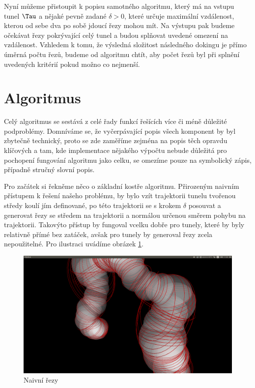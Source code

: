 Nyní můžeme přistoupit k popisu samotného algoritmu, který má na vstupu tunel $ \Tau $
a nějaké pevně zadané $ \delta > 0$, které určuje maximální vzdálenost, kterou
od sebe dva po sobě jdoucí řezy mohou mít. Na výstupu pak budeme očekávat řezy pokrývající
celý tunel a budou splňovat uvedené omezení na vzdálenost. Vzhledem k tomu, že výsledná
složitost následného dokingu je přímo úměrná počtu řezů, budeme od algoritmu chtít,
aby počet řezů byl při splnění uvedených kritérií pokud možno co nejmenší.


\section{Algoritmus}

Celý algoritmus se sestává z celé řady funkcí řešících více či méně důležité podproblémy.
Domníváme se, že vyčerpávající popis všech komponent by byl zbytečně technický,
proto se zde zaměříme zejména na popis těch opravdu klíčových
a tam, kde implementace nějakého výpočtu nebude důležitá pro pochopení fungování
algoritmu jako celku, se omezíme pouze na symbolický zápis, případně stručný slovní
popis.

Pro začátek si řekněme něco o základní kostře algoritmu. Přirozeným naivním přístupem
k řešení našeho problému, by bylo vzít trajektorii tunelu tvořenou středy koulí
jím definované, po této trajektorii se s krokem $ \delta $ posouvat a generovat
řezy se středem na trajektorii a normálou určenou směrem pohybu na trajektorii.
Takovýto přístup by fungoval vcelku dobře pro tunely, které by byly relativně
přímé bez zatáček, avšak pro  tunely by generoval řezy zcela nepoužitelné.
Pro ilustraci uvádíme obrázek \ref{fig:naive_cuts}.

\begin{figure}
    \centering
    \includegraphics[width=\textwidth]{img/naive_cuts.png}
    \caption{Naivní řezy}
  \centering
  \label{fig:naive_cuts}
\end{figure}

